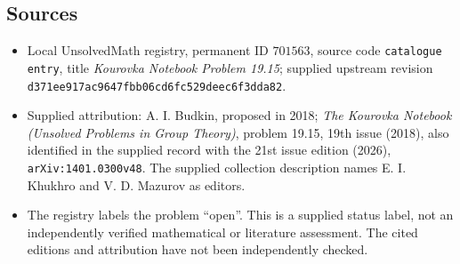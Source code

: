 \documentclass[11pt]{article}
\begin{document}
\subsection{Sources}
\begin{itemize}
\item Local UnsolvedMath registry, permanent ID \(701563\), source code \texttt{catalogue entry}, title \emph{Kourovka Notebook Problem 19.15}; supplied upstream revision \texttt{d371ee917ac9647fbb06cd6fc529deec6f3dda82}.
\item Supplied attribution: A. I. Budkin, proposed in 2018; \emph{The Kourovka Notebook (Unsolved Problems in Group Theory)}, problem 19.15, 19th issue (2018), also identified in the supplied record with the 21st issue edition (2026), \texttt{arXiv:1401.0300v48}. The supplied collection description names E. I. Khukhro and V. D. Mazurov as editors.
\item The registry labels the problem ``open''. This is a supplied status label, not an independently verified mathematical or literature assessment. The cited editions and attribution have not been independently checked.
\end{itemize}
\end{document}
